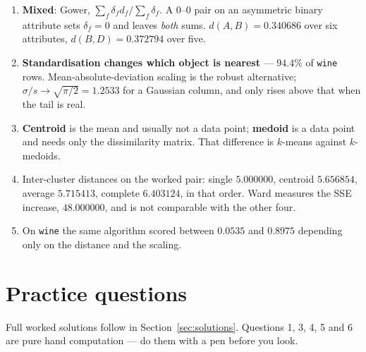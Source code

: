 \documentclass[11pt]{article}
\begin{document}
\begin{enumerate}[leftmargin=*]
    by $M-1$ makes scales of different length commensurable. Equal spacing is
    an assumption.
  \item \textbf{Mixed}: Gower, $\sum_f \delta_f d_f / \sum_f \delta_f$. A
    $0$--$0$ pair on an asymmetric binary attribute sets $\delta_f = 0$ and
    leaves \emph{both} sums. $d(A,B) = 0.340686$ over six attributes,
    $d(B,D) = 0.372794$ over five.
  \item \textbf{Standardisation changes which object is nearest} ---
    $94.4\%$ of \texttt{wine} rows. Mean-absolute-deviation scaling is the
    robust alternative; $\sigma/s \to \sqrt{\pi/2} = 1.2533$ for a Gaussian
    column, and only rises above that when the tail is real.
  \item \textbf{Centroid} is the mean and usually not a data point;
    \textbf{medoid} is a data point and needs only the dissimilarity matrix.
    That difference is $k$-means against $k$-medoids.
  \item Inter-cluster distances on the worked pair: single $5.000000$,
    centroid $5.656854$, average $5.715413$, complete $6.403124$, in that
    order. Ward measures the SSE increase, $48.000000$, and is not
    comparable with the other four.
  \item On \texttt{wine} the same algorithm scored between $0.0535$ and
    $0.8975$ depending only on the distance and the scaling.
\end{enumerate}

\section{Practice questions}
\label{sec:practice}

Full worked solutions follow in Section~\ref{sec:solutions}. Questions 1, 3,
4, 5 and 6 are pure hand computation --- do them with a pen before you look.
\end{document}
